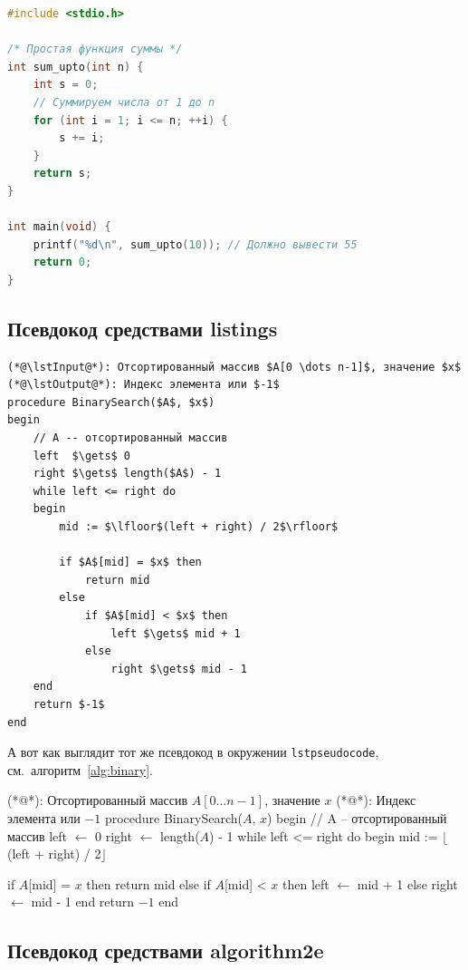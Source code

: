 \documentclass[14pt]{cmcmsuthesis-bachelor}
\begin{document}
\begin{lstlisting}[language=C,caption={Тест C-кода с русскими комментариями}]
#include <stdio.h>

/* Простая функция суммы */
int sum_upto(int n) {
    int s = 0;
    // Суммируем числа от 1 до n
    for (int i = 1; i <= n; ++i) {
        s += i;
    }
    return s;
}

int main(void) {
    printf("%d\n", sum_upto(10)); // Должно вывести 55
    return 0;
}
\end{lstlisting}
\subsection{Псевдокод средствами listings}
\label{sec:org33fa58c}

\begin{lstlisting}[style=pseudocode,caption={Псевдокод через listings}]
(*@\lstInput@*): Отсортированный массив $A[0 \dots n-1]$, значение $x$
(*@\lstOutput@*): Индекс элемента или $-1$
procedure BinarySearch($A$, $x$)
begin
    // A -- отсортированный массив
    left  $\gets$ 0
    right $\gets$ length($A$) - 1
    while left <= right do
    begin
        mid := $\lfloor$(left + right) / 2$\rfloor$

        if $A$[mid] = $x$ then
            return mid
        else
            if $A$[mid] < $x$ then
                left $\gets$ mid + 1
            else
                right $\gets$ mid - 1
    end
    return $-1$
end
\end{lstlisting}

А вот как выглядит тот же псевдокод в окружении \texttt{lstpseudocode}, см.~алгоритм~\ref{alg:binary}.

\begin{lstpseudocode}[caption={Псевдокод через LSTpseudocode}, label={alg:binary}]
(*@\lstInput@*): Отсортированный массив $A[0 \dots n-1]$, значение $x$
(*@\lstOutput@*): Индекс элемента или $-1$
procedure BinarySearch($A$, $x$)
begin
    // A -- отсортированный массив
    left  $\gets$ 0
    right $\gets$ length($A$) - 1
    while left <= right do
    begin
        mid := $\lfloor$(left + right) / 2$\rfloor$

        if $A$[mid] = $x$ then
            return mid
        else
            if $A$[mid] < $x$ then
                left $\gets$ mid + 1
            else
                right $\gets$ mid - 1
    end
    return $-1$
end
\end{lstpseudocode}
\subsection{Псевдокод средствами algorithm2e}
\label{sec:org5ce03fb}
\end{document}
